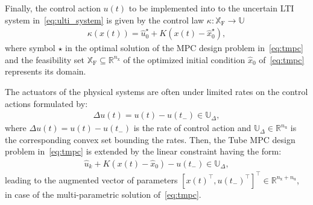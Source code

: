 \documentclass[letterpaper, 10 pt, conference]{ieeeconf}
\begin{document}
Finally, the control action $u(t)$ to be implemented into to the uncertain LTI system in~\eqref{eq:ulti_system} is given by the control law $\kappa : \mathbb{X}_{\mathrm{F}} \rightarrow \mathbb{U}$
\begin{eqnarray}
	\label{eq:tmpc_control_law}
	\kappa(x(t)) = \hat{u}_{0}^{\star} + K \left( x(t) - \hat{x}_{0}^{\star} \right),
\end{eqnarray}
where symbol $\star$ in the optimal solution of the MPC design problem in~\eqref{eq:tmpc} and the feasibility set $\mathbb{X}_{\mathrm{F}} \subseteq \mathbb{R}^{n_{\mathrm{x}}}$ of the optimized initial condition $\hat{x}_{0}$ of~\eqref{eq:tmpc} represents its domain. 


The actuators of the physical systems are often under limited rates on the control actions formulated by:
\begin{eqnarray}
	\label{eq:rate_constraints_x_u}
	\Delta u(t) = u(t) - u(t_{-}) \in \mathbb{U}_{\Delta} ,
\end{eqnarray}
where $\Delta u(t) = u(t) - u(t_{-})$ is the rate of control action and $\mathbb{U}_{\Delta} \in \mathbb{R}^{n_{\mathrm{u}}}$ is the corresponding convex set bounding the rates. Then, the Tube MPC design problem in~\eqref{eq:tmpc} is extended by the linear constraint having the form: 
\begin{eqnarray}
	\label{eq:tmpc_constraints_input_delta_0}
	\hat{u}_{k} + K ( x(t) - \hat{x}_{0} ) - u(t_{-}) \in \mathbb{U}_{\Delta} , 
\end{eqnarray}
leading to the augmented vector of parameters $[x(t)^{\top}, u(t_{-})^{\top}]^{\top} \in \mathbb{R}^{n_{\mathrm{x}} + n_{\mathrm{u}}}$, in case of the multi-parametric solution of~\eqref{eq:tmpc}.
\end{document}
